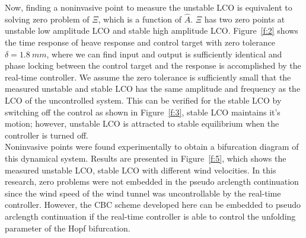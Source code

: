 \documentclass[openacc]{rsproca_new}%
\theoremstyle{own}
\newcommand{\Fref}[1]{Figure~\ref{#1}}
\begin{document}
\noindent Now, finding a noninvasive point to measure the unstable LCO is equivalent to solving zero problem of $\Xi$, which is a function of $\hat A$. $\Xi$ has two zero points at unstable low amplitude LCO and stable high amplitude LCO. \Fref{f:2} shows the time response of heave response and control target with zero tolerance $\delta=1.8 \: mm$, where we can find input and output is sufficiently identical and phase locking between the control target and the response is accomplished by the real-time controller. We assume the zero tolerance is sufficiently small that the measured unstable and stable LCO has the same amplitude and frequency as the LCO of the uncontrolled system. This can be verified for the stable LCO by switching off the control as shown in \Fref{f:3}, stable LCO maintains it's motion; however, unstable LCO is attracted to stable equilibrium when the controller is turned off. \\
Noninvasive points were found experimentally to obtain a bifurcation diagram of this dynamical system. Results are presented in \Fref{f:5}, which shows the measured unstable LCO, stable LCO with different wind velocities. In this research, zero problems were not embedded in the pseudo arclength continuation since the wind speed of the wind tunnel was uncontrollable by the real-time controller. However, the CBC scheme developed here can be embedded to pseudo arclength continuation if the real-time controller is able to control the unfolding parameter of the Hopf bifurcation.
\end{document}
